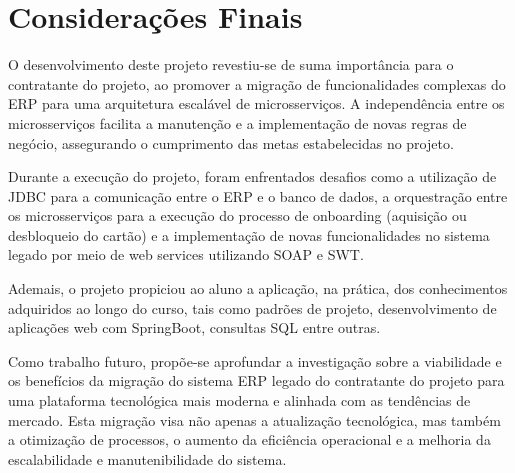 \chapter{Considerações Finais}
\label{cap:conclusoes}

O desenvolvimento deste projeto revestiu-se de suma importância para o contratante do projeto, ao promover a migração de 
funcionalidades complexas do ERP para uma arquitetura escalável de microsserviços. A independência entre os 
microsserviços facilita a manutenção e a implementação de novas regras de negócio, assegurando o cumprimento das metas 
estabelecidas no projeto.

Durante a execução do projeto, foram enfrentados desafios como a utilização de JDBC para a comunicação entre o ERP e o 
banco de dados, a orquestração entre os microsserviços para a execução do processo de onboarding (aquisição ou 
desbloqueio do cartão) e a implementação de novas funcionalidades no sistema legado por meio de web services utilizando 
SOAP e SWT.

Ademais, o projeto propiciou ao aluno a aplicação, na prática, dos conhecimentos adquiridos ao longo do curso, 
tais como padrões de projeto, desenvolvimento de aplicações web com SpringBoot, consultas SQL entre outras.

Como trabalho futuro, propõe-se aprofundar a investigação sobre a viabilidade e os benefícios da migração do sistema ERP 
legado do contratante do projeto para uma plataforma tecnológica mais moderna e alinhada com as tendências de mercado. Esta migração 
visa não apenas a atualização tecnológica, mas também a otimização de processos, o aumento da eficiência operacional e a 
melhoria da escalabilidade e manutenibilidade do sistema.


